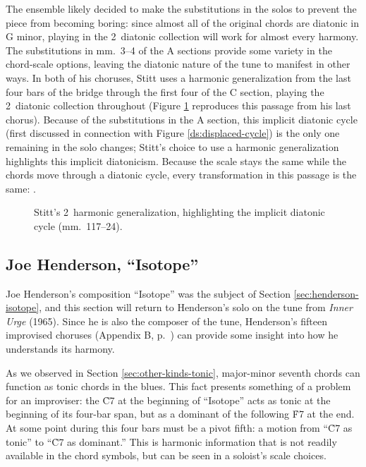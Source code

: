 The ensemble likely decided to make the substitutions in the solos to prevent
the piece from becoming boring: since almost all of the original chords are
diatonic in G minor, playing in the 2\flat\ diatonic collection will work for
almost every harmony. The substitutions in mm.~3--4 of the A
sections provide some variety in the chord-scale options, leaving the diatonic
nature of the tune to manifest in other ways. In both of his choruses, Stitt
uses a harmonic generalization from the last four bars of the bridge through the
first four of the C section, playing the 2\flat\ diatonic collection
throughout (Figure \ref{csa:stitt-diatonic-generalization} reproduces this
passage from his last chorus). Because of the substitutions in the A section,
this implicit diatonic cycle (first discussed in connection with Figure
\ref{ds:displaced-cycle}) is the only one remaining in the solo changes;
Stitt's choice to use a harmonic generalization highlights this implicit
diatonicism. Because the scale stays the same while the chords move
through a diatonic cycle, every transformation in this passage is the same:
.

\begin{figure}[tbp]
  \caption[Stitt's 2\flat\ harmonic generalization, highlighting the implicit
    diatonic cycle.]{Stitt's 2\kern1pt\flat\ harmonic generalization,
    highlighting the implicit diatonic cycle (mm.~117--24).}
  \label{csa:stitt-diatonic-generalization}
\end{figure}

\subsection{Joe Henderson, “Isotope”}
\label{subsec:isotope-solo}

Joe Henderson's composition ``Isotope'' was the subject of Section
\ref{sec:henderson-isotope}, and this section will return to Henderson's solo on
the tune from \emph{Inner Urge} (1965). Since he is also the composer of the
tune, Henderson's fifteen improvised choruses (Appendix B,
p.~\pageref{transcription:isotope}) can provide some insight into how he
understands its harmony.


As we observed in Section \ref{sec:other-kinds-tonic}, major-minor seventh
chords can function as tonic chords in the blues. This fact presents something
of a problem for an improviser: the \h{C7} at the beginning of ``Isotope''
acts as tonic at the beginning of its four-bar span, but as a dominant of the
following \h{F7} at the end. At some point during this four bars
must be a pivot fifth: a motion from ``\h{C7} as tonic'' to ``\h{C7} as
dominant.'' This is harmonic information that is not readily available in the
chord symbols, but can be seen in a soloist's scale choices.

